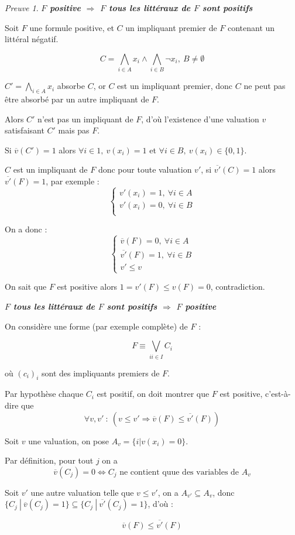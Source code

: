 \documentclass[]{article}
\theoremstyle{remark}
\newtheorem{myproof}{Preuve}
\theoremstyle{definition}
\newenvironment{proofpart}[1]{
	\leavevmode
	
	\noindent
	{\textit{\textbf{\boldmath #1}}}
	
}{
	\checkmark
}
\begin{document}
\begin{myproof}
	\begin{proofpart}{$F$ positive $\Longrightarrow$ $F$ tous les littéraux de $F$ sont positifs}
		Soit $F$ une formule positive, et $C$ un impliquant premier de $F$ contenant un littéral négatif.
		
		$$C = \bigwedge\limits_{i \in A} x_i \land \bigwedge\limits_{i \in B} \neg x_i, ~ B \neq \emptyset$$
		
		$C' = \bigwedge\limits_{i \in A} x_i$ absorbe $C$, or $C$ est un impliquant premier, donc $C$ ne peut pas être absorbé par un autre impliquant de $F$.
		
		Alors $C'$ n'est pas un impliquant de $F$, d'où l'existence d'une valuation $v$ satisfaisant $C'$ mais pas $F$.
		
		Si $\overline{v}(C')=1$ alors $\forall i \in 1, ~ v(x_i)=1$ et $\forall i \in B, ~ v(x_i) \in \{0, 1\}$.
		
		$C$ est un impliquant de $F$ donc pour toute valuation $v'$, si $\overline{v'}(C)=1$ alors $\overline{v'}(F)=1$, par exemple :
		$$\left\{\begin{array}{c}
			v'(x_i)=1, ~ \forall i \in A \\
			v'(x_i)=0, ~ \forall i \in B \\
		\end{array}\right.$$
		
		On a donc :
		$$\left\{\begin{array}{c}
			\overline{v}(F)=0, ~ \forall i \in A \\
			\overline{v'}(F)=1, ~ \forall i \in B \\
			v' \leqslant v
		\end{array}\right.$$
		
		On sait que $F$ est positive alors $1=v'(F) \leqslant v(F)=0$, contradiction.
	\end{proofpart}

	\begin{proofpart}{$F$ tous les littéraux de $F$ sont positifs $\Longrightarrow$ $F$ positive }
		On considère une forme (par exemple complète) de $F$ :
	
		$$F \equiv \bigvee_{ii \in I} C_i$$
		
		où $(c_i)_i$ sont des impliquants premiers de $F$.
		
		Par hypothèse chaque $C_i$ est positif, on doit montrer que $F$ est positive, c'est-à-dire que
		$$\forall v, v' ~ : ~ (v \leqslant v' \Longrightarrow \overline{v}(F) \leqslant \overline{v'}(F))$$
		
		Soit $v$ une valuation, on pose $A_v = \{i | v(x_i) = 0\}$.
		
		Par définition, pour tout $j$ on a $$\overline{v}(C_j) = 0 \Longleftrightarrow C_j \text{ ne contient quue des variables de } A_v$$
		
		Soit $v'$ une autre valuation telle que $v \leqslant v'$, on a $A_{v'} \subseteq A_v$, donc $\{C_j ~ | ~ \overline{v}(C_j) = 1\} \subseteq \{C_j ~ | ~ \overline{v'}(C_j) = 1\}$, d'où :
		
		$$\overline{v}(F) \leqslant \overline{v'}(F)$$
	\end{proofpart}
\end{myproof}
\end{document}
